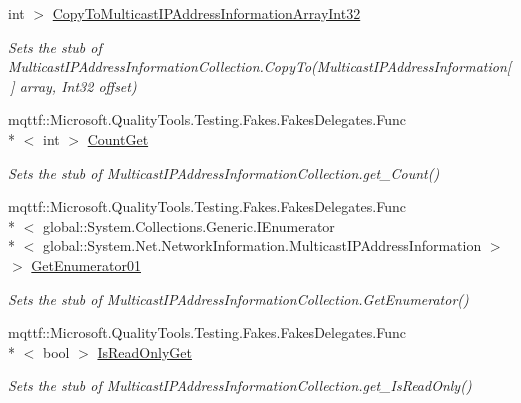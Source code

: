 \begin{DoxyCompactItemize}
int $>$ \hyperlink{class_system_1_1_net_1_1_network_information_1_1_fakes_1_1_stub_multicast_i_p_address_information_collection_a5fd5e70334efceda0a431d170207be9a}{Copy\-To\-Multicast\-I\-P\-Address\-Information\-Array\-Int32}
\begin{DoxyCompactList}\small\item\em Sets the stub of Multicast\-I\-P\-Address\-Information\-Collection.\-Copy\-To(\-Multicast\-I\-P\-Address\-Information\mbox{[}$\,$\mbox{]} array, Int32 offset)\end{DoxyCompactList}\item 
mqttf\-::\-Microsoft.\-Quality\-Tools.\-Testing.\-Fakes.\-Fakes\-Delegates.\-Func\\*
$<$ int $>$ \hyperlink{class_system_1_1_net_1_1_network_information_1_1_fakes_1_1_stub_multicast_i_p_address_information_collection_a6da44fe651c708381d45aed123eeaada}{Count\-Get}
\begin{DoxyCompactList}\small\item\em Sets the stub of Multicast\-I\-P\-Address\-Information\-Collection.\-get\-\_\-\-Count()\end{DoxyCompactList}\item 
mqttf\-::\-Microsoft.\-Quality\-Tools.\-Testing.\-Fakes.\-Fakes\-Delegates.\-Func\\*
$<$ global\-::\-System.\-Collections.\-Generic.\-I\-Enumerator\\*
$<$ global\-::\-System.\-Net.\-Network\-Information.\-Multicast\-I\-P\-Address\-Information $>$ $>$ \hyperlink{class_system_1_1_net_1_1_network_information_1_1_fakes_1_1_stub_multicast_i_p_address_information_collection_ad843900c66b0bc5534cf8290c22e0928}{Get\-Enumerator01}
\begin{DoxyCompactList}\small\item\em Sets the stub of Multicast\-I\-P\-Address\-Information\-Collection.\-Get\-Enumerator()\end{DoxyCompactList}\item 
mqttf\-::\-Microsoft.\-Quality\-Tools.\-Testing.\-Fakes.\-Fakes\-Delegates.\-Func\\*
$<$ bool $>$ \hyperlink{class_system_1_1_net_1_1_network_information_1_1_fakes_1_1_stub_multicast_i_p_address_information_collection_a73d4e807043c15dbb5c2fae094c68d6a}{Is\-Read\-Only\-Get}
\begin{DoxyCompactList}\small\item\em Sets the stub of Multicast\-I\-P\-Address\-Information\-Collection.\-get\-\_\-\-Is\-Read\-Only()\end{DoxyCompactList}\item 

\end{DoxyCompactItemize}
